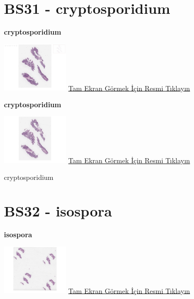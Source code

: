 \documentclass[
  letterpaper,
  DIV=11,
  numbers=noendperiod]{scrreprt}
\begin{document}
\hypertarget{sec-BS31}{%
\section{BS31 - cryptosporidium}\label{sec-BS31}}

\textbf{cryptosporidium}

\href{https://images.patolojiatlasi.com/BS31/HE1.html}{\includegraphics[width=0.25\textwidth,height=\textheight]{./screenshots/thumbnail_BS31-HE1.png}}
\href{https://images.patolojiatlasi.com/BS31/HE1.html}{Tam Ekran Görmek
İçin Resmi Tıklayın}

\textbf{cryptosporidium}

\href{https://images.patolojiatlasi.com/BS31/HE2.html}{\includegraphics[width=0.25\textwidth,height=\textheight]{./screenshots/thumbnail_BS31-HE2.png}}
\href{https://images.patolojiatlasi.com/BS31/HE2.html}{Tam Ekran Görmek
İçin Resmi Tıklayın}

\begin{tcolorbox}[enhanced jigsaw, colbacktitle=quarto-callout-tip-color!10!white, colback=white, titlerule=0mm, opacityback=0, colframe=quarto-callout-tip-color-frame, opacitybacktitle=0.6, bottomrule=.15mm, breakable, coltitle=black, title=\textcolor{quarto-callout-tip-color}{\faLightbulb}\hspace{0.5em}{Tanı}, toprule=.15mm, toptitle=1mm, bottomtitle=1mm, arc=.35mm, rightrule=.15mm, leftrule=.75mm, left=2mm]

cryptosporidium

\end{tcolorbox}

\hypertarget{sec-BS32}{%
\section{BS32 - isospora}\label{sec-BS32}}

\textbf{isospora}

\href{https://images.patolojiatlasi.com/BS32/HE1.html}{\includegraphics[width=0.25\textwidth,height=\textheight]{./screenshots/thumbnail_BS32-HE1.png}}
\href{https://images.patolojiatlasi.com/BS32/HE1.html}{Tam Ekran Görmek
İçin Resmi Tıklayın}
\end{document}
